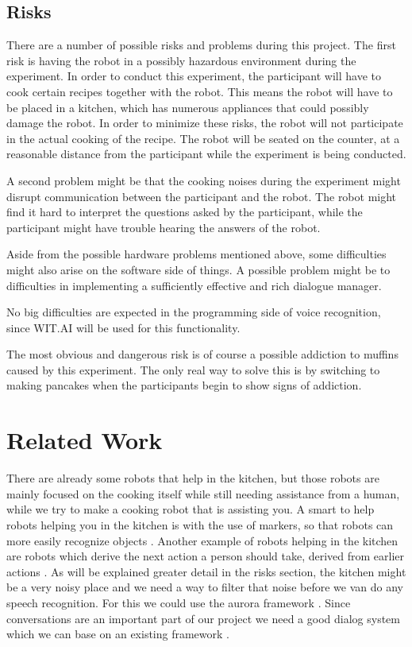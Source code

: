\documentclass[11pt]{article} %
\begin{document}
\subsection{Risks} There are a number of possible risks and problems during this project. The first risk is having the robot in a possibly hazardous environment during the experiment. In order to conduct this experiment, the participant will have to cook certain recipes together with the robot. This means the robot will have to be placed in a kitchen, which has numerous appliances that could possibly damage the robot. In order to minimize these risks, the robot will not participate in the actual cooking of the recipe. The robot will be seated on the counter, at a reasonable distance from the participant while the experiment is being conducted.

A second problem might be that the cooking noises during the experiment might disrupt communication between the participant and the robot. The robot might find it hard to interpret the questions asked by the participant, while the participant might have trouble hearing the answers of the robot.

Aside from the possible hardware problems mentioned above, some difficulties might also arise on the software side of things. A possible problem might be to difficulties in implementing a sufficiently effective and rich dialogue manager. 

No big difficulties are expected in the programming side of voice recognition, since WIT.AI will be used for this functionality.

The most obvious and dangerous risk is of course a possible addiction to muffins caused by this experiment. The only real way to solve this is by switching to making pancakes when the participants begin to show signs of addiction.


\section{Related Work}
There are already some robots that help in the kitchen, but those robots are mainly focused on the cooking itself while still needing assistance from a human\cite{bollini2013interpreting, yan2007novel, 1641754}, while we try to make a cooking robot that is assisting you.
A smart to help robots helping you in the kitchen is with the use of markers, so that robots can more easily recognize objects \cite{sugiura2010cooking}. Another example of robots helping in the kitchen are robots which derive the next action a person should take, derived from earlier actions \cite{1374787}. As will be explained greater detail in the risks section, the kitchen might be a very noisy place and we need a way to filter that noise before we van do any speech recognition. For this we could use the aurora framework \cite{hirsch2000aurora}. Since conversations are an important part of our project we need a good dialog system which we can base on an existing framework \cite{li2006dialog}.
\end{document}
